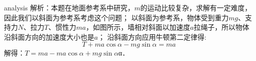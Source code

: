 \begin{example}
	
	\begin{taggedblock}{analysis}
		解析：本题在地面参考系中研究，$ m $的运动比较复杂，求解有一定难度，因此我们以斜面为参考系考虑这个问题；
		以斜面为参考系，物体受到重力$ mg $、支持力$ N $、拉力$ T $、惯性力$ ma $，如图所示，墙相对斜面以加速度$ a $拉绳子，所以物体沿斜面方向的加速度大小也是$ a $；
		沿斜面方向应用牛顿第二定律得:
		\[
		T+ma\cos\alpha-mg\sin\alpha=ma
		\]
		解得：$ T=ma-ma\cos\alpha+mg\sin\alpha $⁡α．
	
		
	\end{taggedblock}
\end{example}


